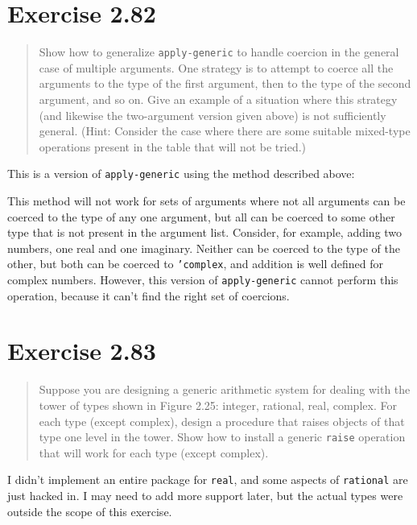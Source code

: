 \documentclass{article}
\begin{document}
\section{Exercise 2.82}
\begin{quote}
    Show how to generalize \texttt{apply-generic} to handle coercion in the
    general case of multiple arguments. One strategy is to attempt to coerce
    all the arguments to the type of the first argument, then to the type of
    the second argument, and so on. Give an example of a situation where this
    strategy (and likewise the two-argument version given above) is not
    sufficiently general. (Hint: Consider the case where there are some
    suitable mixed-type operations present in the table that will not be
    tried.)
\end{quote}

This is a version of \texttt{apply-generic} using the method described above:


This method will not work for sets of arguments where not all arguments can be
coerced to the type of any one argument, but all can be coerced to some other
type that is not present in the argument list. Consider, for example, adding two
numbers, one real and one imaginary. Neither can be coerced to the type of the
other, but both can be coerced to \texttt{'complex}, and addition is well
defined for complex numbers. However, this version of \texttt{apply-generic}
cannot perform this operation, because it can't find the right set of coercions.

\section{Exercise 2.83}
\begin{quote}
    Suppose you are designing a generic arithmetic system for dealing with the
    tower of types shown in Figure 2.25: integer, rational, real, complex. For
    each type (except complex), design a procedure that raises objects of that
    type one level in the tower. Show how to install a generic \texttt{raise}
    operation that will work for each type (except complex).
\end{quote}

I didn't implement an entire package for \texttt{real}, and some aspects of
\texttt{rational} are just hacked in. I may need to add more support later, but
the actual types were outside the scope of this exercise.


\end{document}

